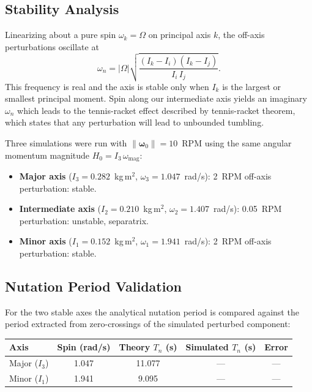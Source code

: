\documentclass[12pt]{article}
\begin{document}
\subsection{Stability Analysis}

Linearizing about a pure spin $\omega_k = \Omega$ on principal axis $k$,
the off-axis perturbations oscillate at
\[
\omega_n = |\Omega|\sqrt{\frac{(I_k - I_i)(I_k - I_j)}{I_i\,I_j}}.
\]
This frequency is real and the axis is stable only when $I_k$
is the largest or smallest principal moment.
Spin along our intermediate axis yields an imaginary $\omega_n$ which leads to  the tennis-racket effect described by tennis-racket theorem, which states that any perturbation will lead to unbounded tumbling.

Three simulations were run with $\|\boldsymbol\omega_0\| = 10$~RPM
using the same angular momentum magnitude $H_0 = I_3\,\omega_\mathrm{mag}$:

\begin{itemize}
    \item \textbf{Major axis} ($I_3 = 0.282$~kg\,m$^2$, $\omega_3 = 1.047$~rad/s):
          2~RPM off-axis perturbation: stable.
    \item \textbf{Intermediate axis} ($I_2 = 0.210$~kg\,m$^2$, $\omega_2 = 1.407$~rad/s):
          0.05~RPM perturbation: unstable, separatrix.
    \item \textbf{Minor axis} ($I_1 = 0.152$~kg\,m$^2$, $\omega_1 = 1.941$~rad/s):
          2~RPM off-axis perturbation: stable.
\end{itemize}

\subsection{Nutation Period Validation}

For the two stable axes the analytical nutation period is compared against the
period extracted from zero-crossings of the simulated perturbed component:

\begin{center}
\begin{tabular}{lcccc}
\hline
\textbf{Axis} & \textbf{Spin (rad/s)} & \textbf{Theory $T_n$ (s)} & \textbf{Simulated $T_n$ (s)} & \textbf{Error} \\
\hline
Major ($I_3$) & 1.047 & 11.077 & --- & --- \\
Minor ($I_1$) & 1.941 & \phantom{0}9.095 & --- & --- \\
\hline
\end{tabular}
\end{center}
\end{document}
